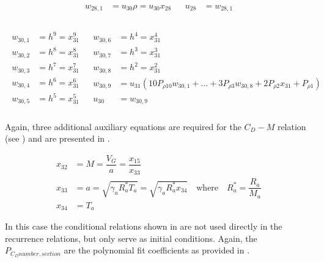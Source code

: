 \begin{align} \label{eq:u28}
\begin{split}
w_{28,1} &= u_{30}\rho = u_{30}x_{28} \\
\end{split}
&
\begin{split}
u_{28} &= w_{28,1} \\
\end{split}
\end{align}

\begin{align} \label{eq:u30}
\begin{split}
w_{30,1} &= h^{9} = x_{31}^9 \\
w_{30,2} &= h^{8} = x_{31}^8 \\
w_{30,3} &= h^{7} = x_{31}^7 \\
w_{30,4} &= h^{6} = x_{31}^6 \\
w_{30,5} &= h^{5} = x_{31}^5 \\
\end{split}
&
\begin{split}
w_{30,6} &= h^{4} = x_{31}^4 \\
w_{30,7} &= h^{3} = x_{31}^3 \\
w_{30,8} &= h^{2} = x_{31}^2 \\
w_{30,9} &= u_{31}\left(10P_{\rho 10}w_{30,1}+\dots +3P_{\rho 3}w_{30,8} + 2P_{\rho 2}x_{31}+P_{\rho 1}\right) \\
\\
u_{30} &= w_{30,9} \\
\end{split}
\end{align}

Again, three additional auxiliary equations are required for the $C_{D}-M$ relation (see ) and are presented in .

 \begin{equation} \label{eq:cdAux}
\begin{split}
x_{32} &= M = \dfrac{V_{G}}{a} = \dfrac{x_{15}}{x_{33}}\\
x_{33} &= a = \sqrt{\gamma_{a}R_{a}^{*}T_{a}} = \sqrt{\gamma_{a}R_{a}^{*}x_{34}} \quad \text{where} \quad R_{a}^{*}=\dfrac{R_{a}}{M_{a}} \\
x_{34} &= T_{a}
\end{split}
\end{equation}

In this case the conditional relations shown in  are not used directly in the recurrence relations, but only serve as initial conditions. Again, the $P_{C_{D} number,section}$ are the polynomial fit coefficients as provided in .


